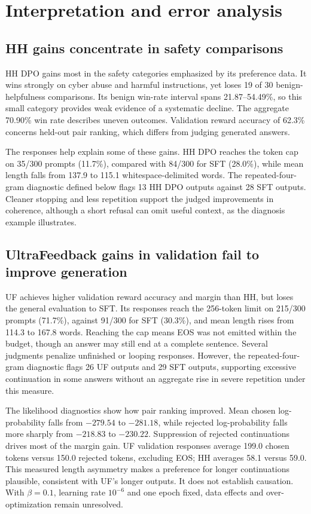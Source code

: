 \documentclass[10pt,a4paper]{article}
\begin{document}
\newpage
\section{Interpretation and error analysis}
\subsection{HH gains concentrate in safety comparisons}
HH DPO gains most in the safety categories emphasized by its preference data. It wins strongly on cyber abuse and harmful instructions, yet loses 19 of 30 benign-helpfulness comparisons. Its benign win-rate interval spans 21.87--54.49\%, so this small category provides weak evidence of a systematic decline. The aggregate 70.90\% win rate describes uneven outcomes. Validation reward accuracy of 62.3\% concerns held-out pair ranking, which differs from judging generated answers.

The responses help explain some of these gains. HH DPO reaches the token cap on 35/300 prompts (11.7\%), compared with 84/300 for SFT (28.0\%), while mean length falls from 137.9 to 115.1 whitespace-delimited words. The repeated-four-gram diagnostic defined below flags 13 HH DPO outputs against 28 SFT outputs. Cleaner stopping and less repetition support the judged improvements in coherence, although a short refusal can omit useful context, as the diagnosis example illustrates.

\subsection{UltraFeedback gains in validation fail to improve generation}
UF achieves higher validation reward accuracy and margin than HH, but loses the general evaluation to SFT. Its responses reach the 256-token limit on 215/300 prompts (71.7\%), against 91/300 for SFT (30.3\%), and mean length rises from 114.3 to 167.8 words. Reaching the cap means EOS was not emitted within the budget, though an answer may still end at a complete sentence. Several judgments penalize unfinished or looping responses. However, the repeated-four-gram diagnostic flags 26 UF outputs and 29 SFT outputs, supporting excessive continuation in some answers without an aggregate rise in severe repetition under this measure.

The likelihood diagnostics show how pair ranking improved. Mean chosen log-probability falls from $-279.54$ to $-281.18$, while rejected log-probability falls more sharply from $-218.83$ to $-230.22$. Suppression of rejected continuations drives most of the margin gain. UF validation responses average 199.0 chosen tokens versus 150.0 rejected tokens, excluding EOS; HH averages 58.1 versus 59.0. This measured length asymmetry makes a preference for longer continuations plausible, consistent with UF's longer outputs. It does not establish causation. With $\beta=0.1$, learning rate $10^{-6}$ and one epoch fixed, data effects and over-optimization remain unresolved.
\end{document}
